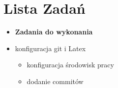 \section{Lista Zadań}

    \begin{itemize}
       \item \textbf{Zadania do wykonania} 
       \item konfiguracja git i Latex
       \begin{itemize}
         \item konfiguracja środowisk pracy
         \item dodanie commitów 

       \end{itemize}
     \end{itemize}
     
   
